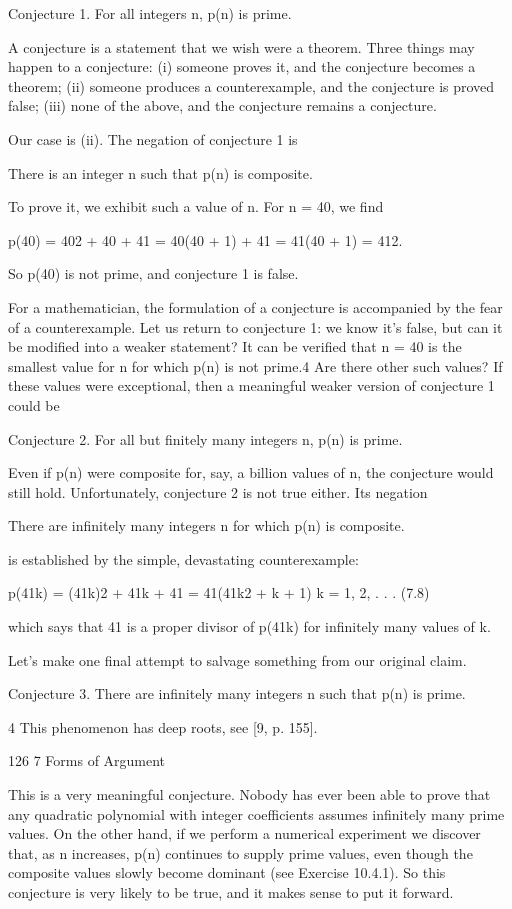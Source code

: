 \documentclass[11pt]{article}
\theoremstyle{plain}
\theoremstyle{definition}
\begin{document}
Conjecture 1. For all integers n, p(n) is prime.

A conjecture is a statement that we wish were a theorem. Three things may happen to a conjecture: (i) someone proves it, and the conjecture becomes a theorem; (ii) someone produces a counterexample, and the conjecture is proved false; (iii) none of the above, and the conjecture remains a conjecture.

Our case is (ii). The negation of conjecture 1 is

There is an integer n such that p(n) is composite.

To prove it, we exhibit such a value of n. For n = 40, we find

p(40) = 402 + 40 + 41 = 40(40 + 1) + 41 = 41(40 + 1) = 412.

So p(40) is not prime, and conjecture 1 is false.

For a mathematician, the formulation of a conjecture is accompanied by the fear of a counterexample. Let us return to conjecture 1: we know it's false, but can it be modified into a weaker statement? It can be verified that n = 40 is the smallest value for n for which p(n) is not prime.4 Are there other such values? If these values were exceptional, then a meaningful weaker version of conjecture 1 could be

Conjecture 2. For all but finitely many integers n, p(n) is prime.

Even if p(n) were composite for, say, a billion values of n, the conjecture would still hold. Unfortunately, conjecture 2 is not true either. Its negation

There are infinitely many integers n for which p(n) is composite.

is established by the simple, devastating counterexample:

p(41k) = (41k)2 + 41k + 41 = 41(41k2 + k + 1) k = 1, 2, . . . (7.8)

which says that 41 is a proper divisor of p(41k) for infinitely many values of k.

Let's make one final attempt to salvage something from our original claim.

Conjecture 3. There are infinitely many integers n such that p(n) is prime.

4 This phenomenon has deep roots, see [9, p. 155].

126 7 Forms of Argument

This is a very meaningful conjecture. Nobody has ever been able to prove that any quadratic polynomial with integer coefficients assumes infinitely many prime values. On the other hand, if we perform a numerical experiment we discover that, as n increases, p(n) continues to supply prime values, even though the composite values slowly become dominant (see Exercise 10.4.1). So this conjecture is very likely to be true, and it makes sense to put it forward.
\end{document}
